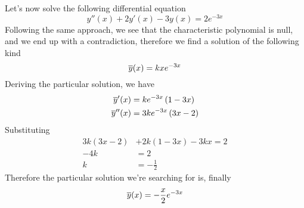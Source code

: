 \documentclass[../complete.tex]{subfiles}
\begin{document}
\begin{eg}
	Let's now solve the following differential equation
	\begin{equation*}
		y''(x)+2y'(x)-3y(x)=2e^{-3x}
	\end{equation*}
	Following the same approach, we see that the characteristic polynomial is null, and we end up with a contradiction, therefore we find a solution of the following kind
	\begin{equation*}
		\overline{y}(x)=kxe^{-3x}
	\end{equation*}
	Deriving the particular solution, we have
	\begin{equation*}
		\begin{aligned}
			\overline{y}'(x)&=ke^{-3x}\left( 1-3x \right)\\
			\overline{y}''(x)&=3ke^{-3x}\left( 3x-2 \right)
		\end{aligned}
	\end{equation*}
	Substituting
	\begin{equation*}
		\begin{aligned}
			3k(3x-2)&+2k(1-3x)-3kx=2\\
			-4k&=2\\
			k&=-\frac{1}{2}
		\end{aligned}
	\end{equation*}
	Therefore the particular solution we're searching for is, finally
	\begin{equation*}
		\overline{y}(x)=-\frac{x}{2}e^{-3x}
	\end{equation*}
\end{eg}
\end{document}
